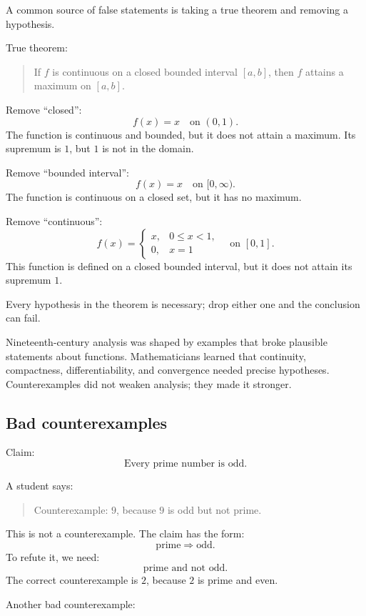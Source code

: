 A common source of false statements is taking a true theorem and removing a hypothesis.

True theorem:

\begin{quote}
If $f$ is continuous on a closed bounded interval $[a,b]$, then $f$ attains a maximum on $[a,b]$.
\end{quote}

Remove ``closed'':
\[
f(x)=x\quad\text{on }(0,1).
\]
The function is continuous and bounded, but it does not attain a maximum. Its supremum is $1$, but $1$ is not in the domain.

Remove ``bounded interval'':
\[
f(x)=x\quad\text{on }[0,\infty).
\]
The function is continuous on a closed set, but it has no maximum.

Remove ``continuous'':
\[
f(x)=
\begin{cases}
x, & 0\leq x<1,\\
0, & x=1
\end{cases}
\quad\text{on }[0,1].
\]
This function is defined on a closed bounded interval, but it does not attain its supremum $1$.

Every hypothesis in the theorem is necessary; drop either one and the conclusion can fail.

\begin{historybox}
Nineteenth-century analysis was shaped by examples that broke plausible statements about functions. Mathematicians learned that continuity, compactness, differentiability, and convergence needed precise hypotheses. Counterexamples did not weaken analysis; they made it stronger.
\end{historybox}

\subsection{Bad counterexamples}

Claim:
\[
\text{Every prime number is odd.}
\]

A student says:

\begin{quote}
Counterexample: $9$, because $9$ is odd but not prime.
\end{quote}

This is not a counterexample. The claim has the form:
\[
\text{prime}\Rightarrow\text{odd}.
\]
To refute it, we need:
\[
\text{prime and not odd}.
\]
The correct counterexample is $2$, because $2$ is prime and even.

Another bad counterexample:

